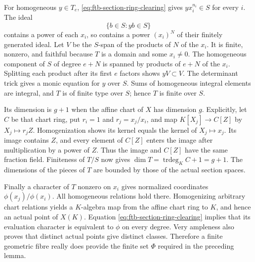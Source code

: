For homogeneous \(y\in T_e\), \eqref{eq:ftb-section-ring-clearing}
gives \(yx_i^{n_i}\in S\) for every \(i\).
The ideal
\[
                       \{b\in S:yb\in S\}
\]
contains a power of each \(x_i\), so contains a power
\((x_i)^N\) of their finitely generated ideal.
Let \(V\) be the \(S\)-span of the products of \(N\)
of the \(x_i\).
It is finite, nonzero, and faithful because \(T\) is a
domain and some \(x_i\ne0\).
The homogeneous component of \(S\) of degree \(e+N\)
is spanned by products of \(e+N\) of the \(x_i\).
Splitting each product after its first \(e\) factors
shows \(yV\subset V\).
The determinant trick gives a monic equation for \(y\)
over \(S\).
Sums of homogeneous integral elements are integral,
and \(T\) is of finite type over \(S\); hence \(T\) is
finite over \(S\).

Its dimension is \(g+1\) when the affine chart of \(X\)
has dimension \(g\).
Explicitly, let \(C\) be that chart ring, put \(r_i=1\)
and \(r_j=x_j/x_i\), and map
\(K[X_j]\to C[Z]\) by \(X_j\mapsto r_jZ\).
Homogenization shows its kernel equals the kernel of
\(X_j\mapsto x_j\).
Its image contains \(Z\), and every element of \(C[Z]\)
enters the image after multiplication by a power of \(Z\).
Thus the image and \(C[Z]\) have the same fraction field.
Finiteness of \(T/S\) now gives
\(\dim T=\operatorname{trdeg}_K C+1=g+1\).
The dimensions of the pieces of \(T\) are bounded by
those of the actual section spaces.

Finally a character of \(T\) nonzero on \(x_i\) gives
normalized coordinates \(\phi(x_j)/\phi(x_i)\).
All homogeneous relations hold there.
Homogenizing arbitrary chart relations yields a
\(K\)-algebra map from the affine chart ring to \(K\),
and hence an actual point of \(X(K)\).
Equation \eqref{eq:ftb-section-ring-clearing} implies
that its evaluation character is equivalent to \(\phi\)
on every degree.
Very ampleness also proves that distinct actual points
give distinct classes.
Therefore a finite geometric fibre really does provide
the finite set \(\Phi\) required in the preceding lemma.

